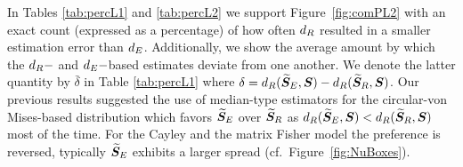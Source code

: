 In Tables \ref{tab:percL1} and \ref{tab:percL2} we support Figure~\ref{fig:comPL2} with an exact count (expressed as a percentage) of how often ${d_R}$ resulted in a smaller estimation error than ${d_E}$.  Additionally, we show the average amount by which the ${d_R}-$ and ${d_E}-$based estimates deviate from one another.  We denote the latter quantity by $\bar\delta$ in Table \ref{tab:percL1} where  $\delta={d_R}({\widetilde{\bm S}_E},\bm S)-{d_R}({\widetilde{\bm S}_R},\bm S)$.    
Our previous results suggested the use of median-type estimators for the circular-von Mises-based distribution which favors ${\widetilde{\bm S}_E}$ over ${\widetilde{\bm S}_R}$ as ${d_R}({\widetilde{\bm S}_E},\bm S) < {d_R}({\widetilde{\bm S}_R},\bm S)$ most of the time.  For the Cayley and the matrix Fisher model the preference is reversed, typically  ${\widetilde{\bm S}_E}$ exhibits a larger spread (cf.~Figure~\ref{fig:NuBoxes}). 


